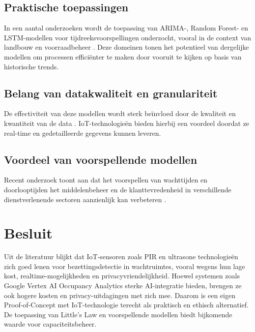 \subsection{Praktische toepassingen}
In een aantal onderzoeken wordt de toepassing van ARIMA-, Random Forest- en LSTM-modellen voor tijdreeksvoorspellingen onderzocht, vooral in de context van landbouw en voorraadbeheer \autocite{Nagendra2023}. Deze domeinen tonen het potentieel van dergelijke modellen om processen efficiënter te maken door vooruit te kijken op basis van historische trends.

\subsection{Belang van datakwaliteit en granulariteit}
De effectiviteit van deze modellen wordt sterk beïnvloed door de kwaliteit en kwantiteit van de data \autocite{Mani2021}. IoT-technologieën bieden hierbij een voordeel doordat ze real-time en gedetailleerde gegevens kunnen leveren.

\subsection{Voordeel van voorspellende modellen}
Recent onderzoek toont aan dat het voorspellen van wachttijden en doorlooptijden het middelenbeheer en de klanttevredenheid in verschillende dienstverlenende sectoren aanzienlijk kan verbeteren \autocite{Benevento2021}.

\section{Besluit}
Uit de literatuur blijkt dat IoT-sensoren zoals PIR en ultrasone technologieën zich goed lenen voor bezettingsdetectie in wachtruimtes, vooral wegens hun lage kost, realtime-mogelijkheden en privacyvriendelijkheid. Hoewel systemen zoals Google Vertex AI Occupancy Analytics sterke AI-integratie bieden, brengen ze ook hogere kosten en privacy-uitdagingen met zich mee. Daarom is een eigen Proof-of-Concept met IoT-technologie terecht als praktisch en ethisch alternatief. De toepassing van Little’s Law en voorspellende modellen biedt bijkomende waarde voor capaciteitsbeheer.



